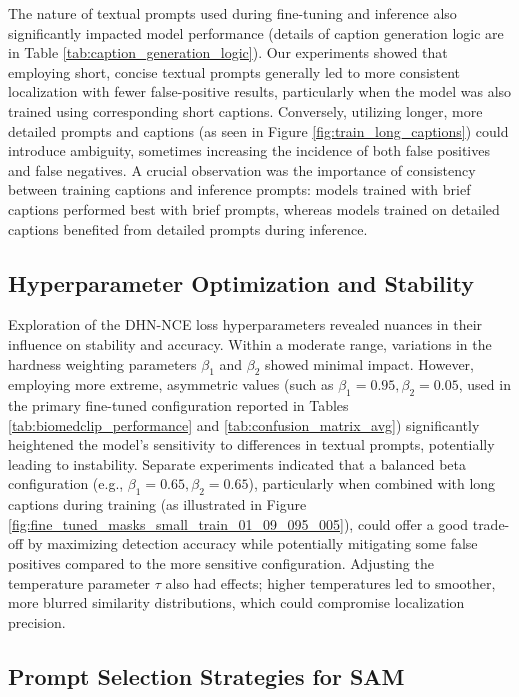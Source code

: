 \documentclass[./dissertation.tex]{subfiles}
\begin{document}
The nature of textual prompts used during fine-tuning and inference also significantly impacted model performance (details of caption generation logic are in Table \ref{tab:caption_generation_logic}). Our experiments showed that employing short, concise textual prompts generally led to more consistent localization with fewer false-positive results, particularly when the model was also trained using corresponding short captions. Conversely, utilizing longer, more detailed prompts and captions (as seen in Figure \ref{fig:train_long_captions}) could introduce ambiguity, sometimes increasing the incidence of both false positives and false negatives. A crucial observation was the importance of consistency between training captions and inference prompts: models trained with brief captions performed best with brief prompts, whereas models trained on detailed captions benefited from detailed prompts during inference.

\subsection{Hyperparameter Optimization and Stability}

Exploration of the DHN-NCE loss hyperparameters revealed nuances in their influence on stability and accuracy. Within a moderate range, variations in the hardness weighting parameters \( \beta_1 \) and \( \beta_2 \) showed minimal impact. However, employing more extreme, asymmetric values (such as \( \beta_1 = 0.95, \beta_2 = 0.05 \), used in the primary fine-tuned configuration reported in Tables \ref{tab:biomedclip_performance} and \ref{tab:confusion_matrix_avg}) significantly heightened the model's sensitivity to differences in textual prompts, potentially leading to instability. Separate experiments indicated that a balanced beta configuration (e.g., \( \beta_1 = 0.65, \beta_2 = 0.65 \)), particularly when combined with long captions during training (as illustrated in Figure \ref{fig:fine_tuned_masks_small_train_01_09_095_005}), could offer a good trade-off by maximizing detection accuracy while potentially mitigating some false positives compared to the more sensitive configuration. Adjusting the temperature parameter \( \tau \) also had effects; higher temperatures led to smoother, more blurred similarity distributions, which could compromise localization precision.

\subsection{Prompt Selection Strategies for SAM}
\end{document}
